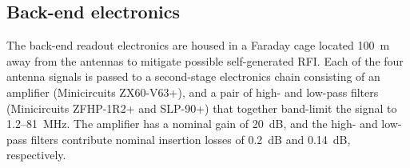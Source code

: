 \documentclass{ws-jai}
\begin{document}



\subsection{Back-end electronics}

The back-end readout electronics are housed in a Faraday cage located
100~m away from the antennas to mitigate possible self-generated RFI.
Each of the four antenna signals is passed to a second-stage
electronics chain consisting of an amplifier (Minicircuits ZX60-V63+),
and a pair of high- and low-pass filters (Minicircuits ZFHP-1R2+ and
SLP-90+) that together band-limit the signal to 1.2--\SI{81}{MHz}.
The amplifier has a nominal gain of 20~dB, and the high- and low-pass
filters contribute nominal insertion losses of 0.2~dB and 0.14~dB,
respectively.
\end{document}
